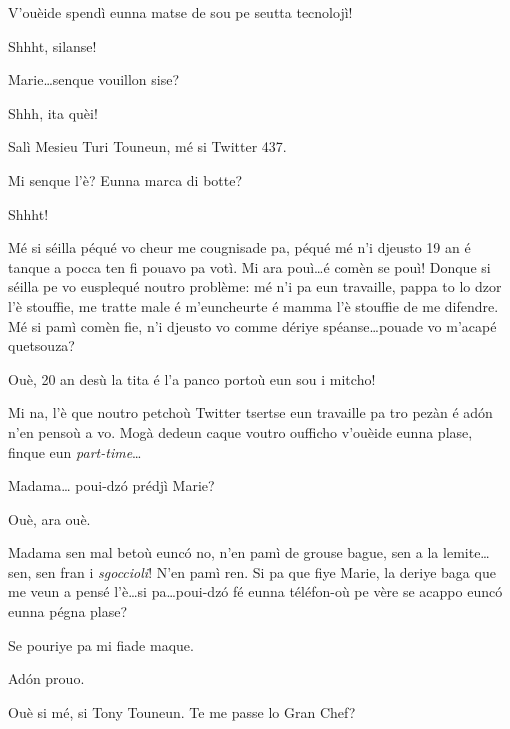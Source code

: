 \begin{drama}
\Turispeaks{} V'ouèide spendì eunna matse de sou pe seutta tecnolojì!

\Mariespeaks Shhht, silanse!


\Turispeaks{} Marie\ldots senque vouillon sise?

\Mariespeaks Shhh, ita quèi!

\Twitterspeaks Salì Mesieu Turi Touneun, mé si Twitter 437.

\Turispeaks{} Mi senque l'è? Eunna marca di botte?

\Mariespeaks Shhht!

\Twitterspeaks{} Mé si séilla péqué vo cheur me cougnisade pa, péqué mé n'i djeusto 19 an é tanque a pocca ten fi pouavo pa votì.  Mi ara pouì\ldots é comèn se pouì! Donque si séilla pe vo eusplequé noutro problème: mé n'i pa eun travaille, pappa to lo dzor l'è stouffie, me tratte male é m'euncheurte é mamma l’è stouffie de me difendre. Mé si pamì comèn fie, n'i djeusto vo comme dériye spéanse\ldots pouade vo m'acapé quetsouza?

\Tanteunspeaks{} Ouè,  20 an desù la tita é l’a panco portoù eun sou i mitcho!

\Alicespeaks{} Mi na, l'è que noutro petchoù Twitter tsertse eun travaille pa tro pezàn é ad\'on n’en pensoù a vo. Mogà dedeun caque voutro oufficho v'ouèide eunna plase, finque eun \textit{part-time}\ldots

\Turispeaks Madama\ldots {} poui-dz\'o prédjì Marie?

\Mariespeaks Ouè, ara ouè.

\Turispeaks{} Madama sen mal betoù eunc\'o no, n'en pamì de grouse bague, sen a la lemite\ldots sen, sen fran i \textit{sgoccioli}! N'en pamì ren.  Si pa que fiye Marie, la deriye baga que me veun a pensé l'è\ldots si pa\ldots poui-dz\'o fé eunna téléfon-où pe vère se acappo eunc\'o eunna pégna plase?

\Mariespeaks Se pouriye pa mi fiade maque.

\Turispeaks Ad\'on prouo.



\Turispeaks{} Ouè si mé, si Tony Touneun. Te me passe lo Gran Chef? 


\end{drama}
